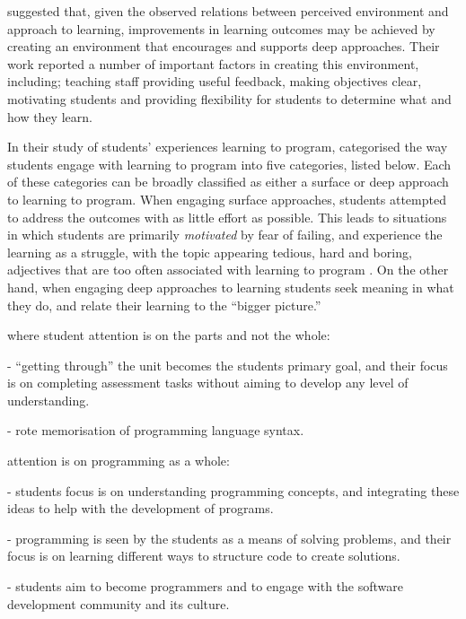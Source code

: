 \citet{Trigwell:1999} suggested that, given the observed relations between perceived environment and approach to learning, improvements in learning outcomes may be achieved by creating an environment that encourages and supports deep approaches.  Their work reported a number of important factors in creating this environment, including; teaching staff providing useful feedback, making objectives clear, motivating students and providing flexibility for students to determine what and how they learn. 

In their study of students' experiences learning to program, \citet{Bruce:2003} categorised the way students engage with learning to program into five categories, listed below. Each of these categories can be broadly classified as either a surface or deep approach to learning to program. When engaging surface approaches, students attempted to address the outcomes with as little effort as possible. This leads to situations in which students are primarily \emph{motivated} by fear of failing, and experience the learning as a struggle, with the topic appearing tedious, hard and boring, adjectives that are too often associated with learning to program \cite{McGettrick:2005}. On the other hand, when engaging deep approaches to learning students seek meaning in what they do, and relate their learning to the ``bigger picture.'' 

\begin{description}
	\item[Surface Approaches] where student attention is on the parts and not the whole:
	\begin{description}
		\item[Following] - ``getting through'' the unit becomes the students primary goal, and their focus is on completing assessment tasks without aiming to develop any level of understanding.
		\item[Coding] - rote memorisation of programming language syntax.
	\end{description}
	\item[Deep Approaches] attention is on programming as a whole:
	\begin{description}
		\item[Understanding and integrating concepts] - students focus is on understanding programming concepts, and integrating these ideas to help with the development of programs.
		\item[Problem solving] -  programming is seen by the students as a means of solving problems, and their focus is on learning different ways to structure code to create solutions.
		\item[Participation/enculturation] - students aim to become programmers and to engage with the software development community and its culture.
	\end{description}
\end{description}

